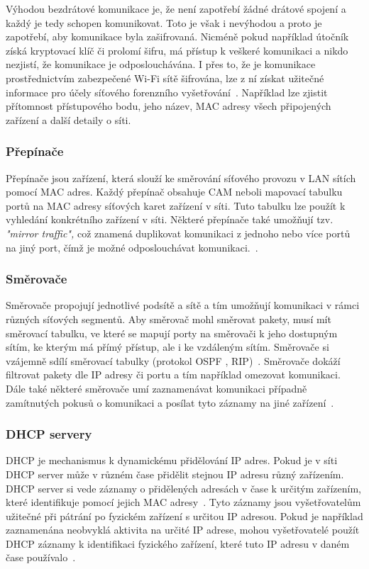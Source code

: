             Výhodou bezdrátové komunikace je, že není zapotřebí žádné drátové spojení a každý je tedy schopen komunikovat. Toto je však i nevýhodou a proto je zapotřebí, aby komunikace byla zašifrovaná. Nicméně pokud například útočník získá kryptovací klíč či prolomí šifru, má přístup k veškeré komunikaci a nikdo nezjistí, že komunikace je odposlouchávána. I přes to, že je komunikace prostřednictvím zabezpečené Wi-Fi sítě šifrována, lze z ní získat užitečné informace pro účely síťového forenzního vyšetřování~\cite{BookTrackingHackersReference}. Například lze zjistit přítomnost přístupového bodu, jeho název, \gls{MAC} adresy všech připojených zařízení a další detaily o síti.
            
        \subsubsection*{Přepínače}
            Přepínače jsou zařízení, která slouží ke směrování síťového provozu v \gls{LAN} sítích pomocí \gls{MAC} adres. Každý přepínač obsahuje \gls{CAM} neboli mapovací tabulku portů na \gls{MAC} adresy síťových karet zařízení v síti. Tuto tabulku lze použít k vyhledání konkrétního zařízení v síti. Některé přepínače také umožňují tzv. \textit{"mirror traffic", } což znamená duplikovat komunikaci z jednoho nebo více portů na jiný port, čímž je možné odposlouchávat komunikaci.~\cite{BookTrackingHackersReference}.
            
        \subsubsection*{Směrovače}
            Směrovače propojují jednotlivé podsítě a sítě a tím umožňují komunikaci v rámci různých síťových segmentů. Aby směrovač mohl směrovat pakety, musí mít směrovací tabulku, ve které se mapují porty na směrovači k jeho dostupným sítím, ke kterým má přímý přístup, ale i ke vzdáleným sítím. Směrovače si vzájemně sdílí směrovací tabulky (protokol \gls{OSPF} , \gls{RIP})~\cite{MatousekBookReference}. Směrovače dokáží filtrovat pakety dle \gls{IP} adresy či portu a tím například omezovat komunikaci. Dále také některé směrovače umí zaznamenávat komunikaci případně zamítnutých pokusů o komunikaci a posílat tyto záznamy na jiné zařízení~\cite{BookTrackingHackersReference}.
            
        \subsubsection*{\gls{DHCP} servery}
            \gls{DHCP} je mechanismus k dynamickému přidělování \gls{IP} adres. Pokud je v síti \gls{DHCP} server může v různém čase přidělit stejnou \gls{IP} adresu různý zařízením. \gls{DHCP} server si vede záznamy o přidělených adresách v čase k určitým zařízením, které identifikuje pomocí jejich \gls{MAC} adresy~\cite{ComputerNetworking}. Tyto záznamy jsou vyšetřovatelům užitečné při pátrání po fyzickém zařízení s určitou \gls{IP} adresou. Pokud je například zaznamenána neobvyklá aktivita na určité IP adrese, mohou vyšetřovatelé použít \gls{DHCP} záznamy k identifikaci fyzického zařízení, které tuto IP adresu v daném čase používalo~\cite{FundamentalsOfNetworkForensicsReference}.

